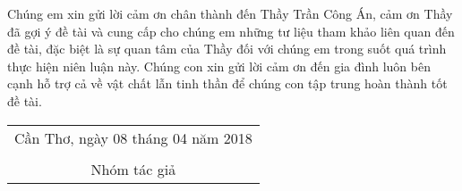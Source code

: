 \documentclass[./thesis.tex]{subfiles}
\begin{document}
Chúng em xin gửi lời cảm ơn chân thành đến Thầy Trần Công Án, cảm ơn Thầy đã gợi ý đề tài và cung cấp cho chúng em những tư liệu tham khảo liên quan đến đề tài, đặc biệt là sự quan tâm của Thầy đối với chúng em trong suốt quá trình thực hiện niên luận này. Chúng con xin gửi lời cảm ơn đến gia đình luôn bên cạnh hỗ trợ cả về vật chất lẫn tinh thần để chúng con tập trung hoàn thành tốt đề tài.


\hspace*{\fill}
\begin{tabular}{@{}c@{}} 

\\
Cần Thơ, ngày 08 tháng 04 năm 2018\\ \\
Nhóm tác giả
\end{tabular}
\end{document}

